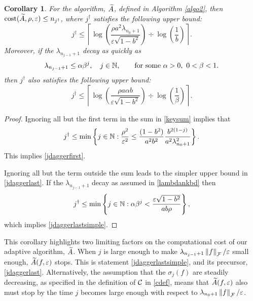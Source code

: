 \documentclass[final]{elsarticle}
\newtheorem{cor}[theorem]{Corollary}
\theoremstyle{definition}
\theoremstyle{remark}
\begin{document}
\begin{cor} For the algorithm, $\tA$, defined in Algorithm \ref{algo2}, then $\cost(\tA,\rho,\varepsilon) \le n_{j^\dagger}$, where $j^\dagger$ satisfies the following upper bound:
\begin{equation} \label{jdaggerfirst}
j^\dagger \le \left \lceil \log\left(\frac{\rho a^2\lambda_{n_{0}+1} }{\varepsilon \sqrt{1 - b^2}}\right) \div \log\left(\frac{1}{b}\right) \right \rceil.
\end{equation}
Moreover, if the $\lambda_{n_{j-1}+1}$ decay as quickly as
\begin{equation}
\label{lambdankbd}
\lambda_{n_{j-1}+1} \le \alpha \beta^j,  \quad j \in \naturals,  \qquad \text{for some } \alpha > 0, \ 0 < \beta < 1.
\end{equation}
then $j^\dagger$ also satisfies the following upper bound:
\begin{equation}
\label{jdaggerlastsimple}
j^\dagger \le
\left \lceil \log\left(\frac{\rho a\alpha b }{\varepsilon \sqrt{1 - b^2}}\right) \div \log\left(\frac{1}{\beta}\right) \right \rceil.
\end{equation}
\end{cor}

\begin{proof}
Ignoring all but the first term in the sum in \eqref{keysum} implies that 
\begin{equation} \label{jsumupperbd}
j^\dagger \le \min \left \{j \in \naturals : \frac{\rho^2}{\varepsilon^2} \le \frac{(1 - b^2)}{a^2b^2} \frac{b^{2(1-j)}}{a^2\lambda_{n_{0}+1}^2}    \right\}.
\end{equation}
This implies \eqref{jdaggerfirst}.

Ignoring all but the term outside the sum leads to the simpler upper bound in \eqref{jdaggerlast}.  If the $\lambda_{n_{j-1}+1}$ decay as assumed in \eqref{lambdankbd} then
\[
j^\dagger \le \min \left \{j \in \naturals :  \alpha \beta^j < \frac{\varepsilon\sqrt{1 - b^2}}{ab \rho} \right\},
\]
which implies \eqref{jdaggerlastsimple}.
\end{proof}

This corollary highlights two limiting factors on the computational cost of our adaptive algorithm, $\tA$. When $j$ is large enough to make $\lambda_{n_{j-1}+1}\norm[\cf]{f}/\varepsilon$ small enough, $\tA(f,\varepsilon)$ stops.  This is statement \eqref{jdaggerlastsimple}, and its precursor, \eqref{jdaggerlast}.  Alternatively, the assumption that the $\sigma_j(f)$ are steadily decreasing, as specified in the definition of $\cc$ in \eqref{cdef}, means that $\tA(f,\varepsilon)$ also must stop by the time $j$ becomes large enough with respect to $\lambda_{n_0+1}\norm[\cf]{f}/\varepsilon$.
\end{document}
